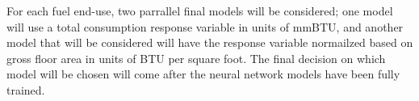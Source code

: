 For each fuel end-use, two parrallel final models will be considered; one model will use a total consumption response variable in units of mmBTU, and another model that will be considered will have the response variable normailzed based on gross floor area in units of BTU per square foot.  The final decision on which model will be chosen will come after the neural network models have been fully trained.